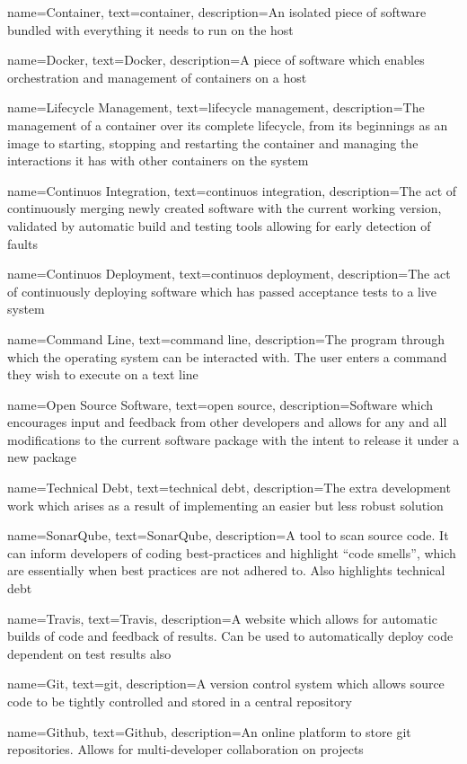 {
    name={Container},
    text={container},
    description={An isolated piece of software bundled with everything it needs to run on the host}
}

{
		name={Docker},
    text={Docker},
		description={A piece of software which enables orchestration and management of containers on a host}
}

{
		name={Lifecycle Management},
    text={lifecycle management},
		description={The management of a container over its complete lifecycle, from its beginnings as an image to starting, stopping and restarting the container and managing the interactions it has with other containers on the system}
}

{
		name={Continuos Integration},
    text={continuos integration},
		description={The act of continuously merging newly created software with the current working version, validated by automatic build and testing tools allowing for early detection of faults}
}

{
		name={Continuos Deployment},
    text={continuos deployment},
		description={The act of continuously deploying software which has passed acceptance tests to a live system}
}

{
    name={Command Line},
    text={command line},
    description={The program through which the operating system can be interacted with. The user enters a command they wish to execute on a text line}
}

{
    name={Open Source Software},
    text={open source},
    description={Software which encourages input and feedback from other developers and allows for any and all modifications to the current software package with the intent to release it under a new package}
}

{
    name={Technical Debt},
    text={technical debt},
    description={The extra development work which arises as a result of implementing an easier but less robust solution}
}

{
    name={SonarQube},
    text={SonarQube},
    description={A tool to scan source code. It can inform developers of coding best-practices and highlight ``code smells'', which are essentially when best practices are not adhered to. Also highlights technical debt}
}

{
    name={Travis},
    text={Travis},
    description={A website which allows for automatic builds of code and feedback of results. Can be used to automatically deploy code dependent on test results also}
}

{
    name={Git},
    text={git},
    description={A version control system which allows source code to be tightly controlled and stored in a central repository}
}

{
    name={Github},
    text={Github},
    description={An online platform to store git repositories. Allows for multi-developer collaboration on projects}
}
